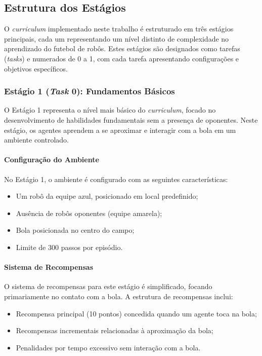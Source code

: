 \subsection{Estrutura dos Estágios}

O \textit{curriculum} implementado neste trabalho é estruturado em três estágios principais, cada um representando um nível distinto de complexidade no aprendizado do futebol de robôs. Estes estágios são designados como tarefas (\textit{tasks}) e numerados de 0 a 1, com cada tarefa apresentando configurações e objetivos específicos.

\subsubsection{Estágio 1 (\textit{Task} 0): Fundamentos Básicos}
\label{subsubsec:estagio1}

O Estágio 1 representa o nível mais básico do \textit{curriculum}, focado no desenvolvimento de habilidades fundamentais sem a presença de oponentes. Neste estágio, os agentes aprendem a se aproximar e interagir com a bola em um ambiente controlado.

\paragraph{Configuração do Ambiente}

No Estágio 1, o ambiente é configurado com as seguintes características:
\begin{itemize}
    \item Um robô da equipe azul, posicionado em local predefinido;
    \item Ausência de robôs oponentes (equipe amarela);
    \item Bola posicionada no centro do campo;
    \item Limite de 300 passos por episódio.
\end{itemize}

\paragraph{Sistema de Recompensas}

O sistema de recompensas para este estágio é simplificado, focando primariamente no contato com a bola. A estrutura de recompensas inclui:
\begin{itemize}
    \item Recompensa principal (10 pontos) concedida quando um agente toca na bola;
    \item Recompensas incrementais relacionadas à aproximação da bola;
    \item Penalidades por tempo excessivo sem interação com a bola.
\end{itemize}

